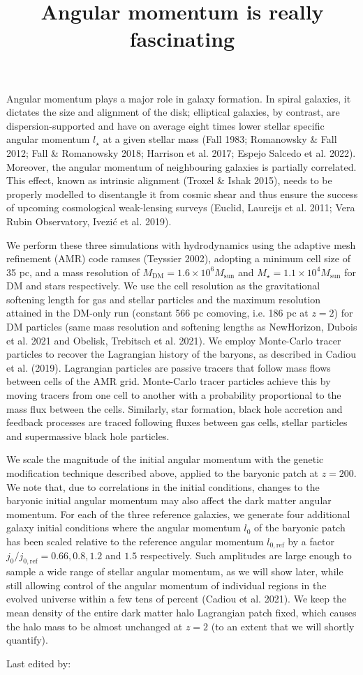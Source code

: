 \documentclass{article}
\title{Angular momentum is really fascinating}
\begin{document}
\maketitle

Angular momentum plays a major role in galaxy formation. In spiral
galaxies, it dictates the size and alignment of the disk; elliptical galaxies, by contrast, are dispersion-supported and have on average eight
times lower stellar specific angular momentum $l_\star$ at a given stellar mass (Fall 1983; Romanowsky \& Fall 2012; Fall \& Romanowsky
2018; Harrison et al. 2017; Espejo Salcedo et al. 2022). Moreover, the
angular momentum of neighbouring galaxies is partially correlated.
This effect, known as intrinsic alignment (Troxel \& Ishak 2015),
needs to be properly modelled to disentangle it from cosmic shear
and thus ensure the success of upcoming cosmological weak-lensing
surveys (Euclid, Laureijs et al. 2011; Vera Rubin Observatory, Ivezić
et al. 2019).

We perform these three simulations with hydrodynamics using
the adaptive mesh refinement (AMR) code ramses (Teyssier 2002),
adopting a minimum cell size of 35 pc, and a mass resolution of $M_\mathrm{DM} = 1.6 \times 10^6 M_\mathrm{sun}$ and $M_\star = 1.1 \times 10^4 M_\mathrm{sun}$ for DM and stars
respectively. We use the cell resolution as the gravitational softening
length for gas and stellar particles and the maximum resolution attained in the DM-only run (constant 566 pc comoving, i.e. 186 pc at
$z=2$) for DM particles (same mass resolution and softening lengths
as NewHorizon, Dubois et al. 2021 and Obelisk, Trebitsch et al.
2021). We employ Monte-Carlo tracer particles to recover the Lagrangian history of the baryons, as described in Cadiou et al. (2019).
Lagrangian particles are passive tracers that follow mass flows between cells of the AMR grid. Monte-Carlo tracer particles achieve this by moving tracers from one cell to another with a probability proportional to the mass flux between the cells. Similarly, star formation, black hole accretion and feedback processes are traced following
fluxes between gas cells, stellar particles and supermassive black hole
particles.

We scale the magnitude of the initial angular momentum with
the genetic modification technique described above, applied to the
baryonic patch at $z = 200$. We note that, due to correlations in the
initial conditions, changes to the baryonic initial angular momentum
may also affect the dark matter angular momentum. For each of the
three reference galaxies, we generate four additional galaxy initial
conditions where the angular momentum $l_0$ of the baryonic patch
has been scaled relative to the reference angular momentum $l_{0,\mathrm{ref}}$ by a
factor $j_0/ j_{0,\mathrm{ref}} = 0.66, 0.8, 1.2$ and $1.5$ respectively. Such amplitudes
are large enough to sample a wide range of stellar angular momentum,
as we will show later, while still allowing control of the angular
momentum of individual regions in the evolved universe within a
few tens of percent (Cadiou et al. 2021). We keep the mean density
of the entire dark matter halo Lagrangian patch fixed, which causes
the halo mass to be almost unchanged at $z = 2$ (to an extent that we
will shortly quantify).

Last edited by:
\end{document}
